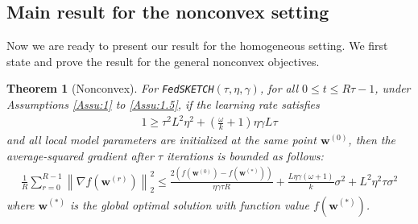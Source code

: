 \documentclass[twoside]{article}
\newtheorem{theorem}{Theorem}
\begin{document}
\subsection{Main result for the nonconvex setting}
Now we are ready to present our result for the homogeneous setting. We first state and prove the result for the general nonconvex objectives.  
\begin{theorem}[Nonconvex]\label{thm:lsgwd-lr} For \texttt{FedSKETCH}$(\tau, \eta, \gamma)$, for all $0\leq t\leq R\tau-1$,  under Assumptions \ref{Assu:1} to \ref{Assu:1.5}, if the learning rate satisfies \begin{align}
   1\geq {\tau^2 L^2\eta^2}+\left(\frac{\omega}{k}+1\right){\eta\gamma L}{\tau}
\label{eq:cnd-thm4.3}
\end{align}
and all local model parameters are initialized at the same point ${\boldsymbol{w}}^{(0)}$, then the average-squared gradient after $\tau$ iterations is bounded as follows:
\begin{align}
        \frac{1}{R}\sum_{r=0}^{R-1}\left\|\nabla f({\boldsymbol{w}}^{(r)})\right\|_2^2\leq \frac{2\left(f(\boldsymbol{w}^{(0)})-f(\boldsymbol{w}^{(*)})\right)}{\eta\gamma\tau R}+\frac{L\eta\gamma{\left(\omega+1\right)}}{k}\sigma^2+{L^2\eta^2\tau }\sigma^2\label{eq:thm1-result} 
\end{align}
where $\boldsymbol{w}^{(*)}$ is the global optimal solution with  function value $f(\boldsymbol{w}^{(*)})$.
\end{theorem}
\end{document}
